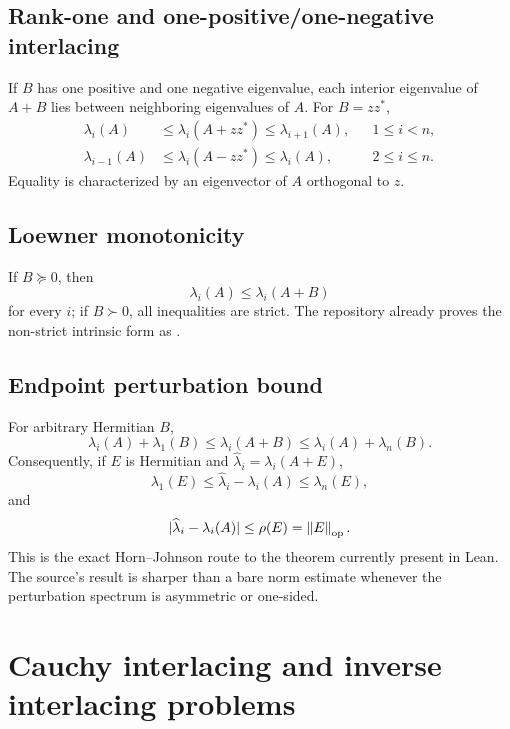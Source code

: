 \subsection{Rank-one and one-positive/one-negative interlacing}

If $B$ has one positive and one negative eigenvalue, each interior eigenvalue of $A+B$ lies between neighboring eigenvalues of $A$. For $B=zz^*$,
\begin{align}
  \lambda_i(A)&\le\lambda_i(A+zz^*)\le\lambda_{i+1}(A), &&1\le i<n, \tag{HJ-rank-one-plus}\\
  \lambda_{i-1}(A)&\le\lambda_i(A-zz^*)\le\lambda_i(A), &&2\le i\le n. \tag{HJ-rank-one-minus}
\end{align}
Equality is characterized by an eigenvector of $A$ orthogonal to $z$.

\subsection{Loewner monotonicity}

If $B\succeq0$, then
\[
  \lambda_i(A)\le\lambda_i(A+B)
\]
for every $i$; if $B\succ0$, all inequalities are strict. The repository already proves the non-strict intrinsic form as
.

\subsection{Endpoint perturbation bound}

For arbitrary Hermitian $B$,
\begin{equation}
  \lambda_i(A)+\lambda_1(B)
  \le\lambda_i(A+B)
  \le\lambda_i(A)+\lambda_n(B). \tag{HJ-Weyl-endpoint}
\end{equation}
Consequently, if $E$ is Hermitian and $\widehat\lambda_i=\lambda_i(A+E)$,
\begin{equation}
  \lambda_1(E)
  \le\widehat\lambda_i-\lambda_i(A)
  \le\lambda_n(E), \tag{HJ-6.3.4.1}
\end{equation}
and
\[
  |\widehat\lambda_i-\lambda_i(A)|
  \le \rho(E)=\left\lVert E\right\rVert_{\mathrm{op}}.
\]
This is the exact Horn--Johnson route to the theorem currently present in Lean. The source's result is sharper than a bare norm estimate whenever the perturbation spectrum is asymmetric or one-sided.

\section{Cauchy interlacing and inverse interlacing problems}


